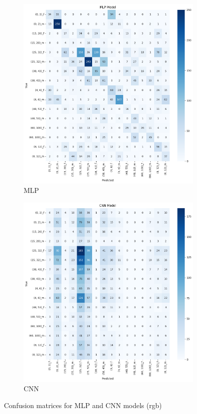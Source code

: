 \documentclass{article}
\begin{document}
\begin{figure}[H]
    \centering
    \begin{subfigure}[b]{0.48\textwidth}
        \includegraphics[width=\textwidth]{assets/confusion_matrix/rgb/MLP.png}
        \caption{MLP}
    \end{subfigure}
    \hfill
    \begin{subfigure}[b]{0.48\textwidth}
        \includegraphics[width=\textwidth]{assets/confusion_matrix/rgb/CNN.png}
        \caption{CNN}
    \end{subfigure}
    \caption{Confusion matrices for MLP and CNN models (rgb)}
    \label{fig:rgb_confusion_matrices_5}
\end{figure}
\end{document}
